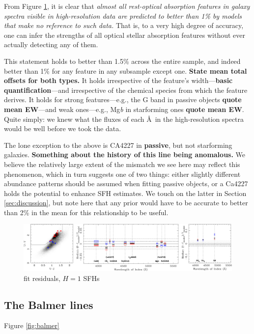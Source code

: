 \documentclass[a4paper,fleqn,usenatbib]{mnras}
\newcommand{\bfr}{\bf\color{red}}
\begin{document}
From Figure \ref{fig:resids}, it is clear that {\it almost all rest-optical absorption features in galaxy 
spectra visible in high-resolution data are predicted to better than 1\% by models that make no reference
to such data.} That is, to a very high degree of accuracy, one can infer the strengths of all optical
stellar absorption features without ever actually detecting any of them.

This statement holds to better than 1.5\% across the entire sample, and indeed better than 1\% for any 
feature in any subsample except one. {\bfr State mean total offsets for both types.} It holds irrespective 
of the feature's width---{\bfr basic quantification}---and irrespective of the chemical species from which 
the feature derives. It holds for strong features---e.g., the G band in passive objects {\bfr quote mean
EW}---and weak ones---e.g., Mg{\it b} in starforming ones {\bfr quote mean EW}. Quite simply: we 
knew what the fluxes of each \AA\ in the high-resolution spectra would be well before we took the data.

The lone exception to the above is CA4227 in {\bfr passive}, but not starforming galaxies. {\bfr Something 
about the history of this line being anomalous.} We believe the relatively large extent of the mismatch we 
see here may reflect this phenomenon, which in turn suggests one of two things: either slightly different
abundance patterns should be assumed when fitting passive objects, or a Ca4227 holds the potential
to enhance SFH estimates. We touch on the latter in Section \ref{sec:discussion}, but note here that
any prior would have to be accurate to better than 2\% in the mean for this relationship to be useful.

\begin{figure}
\includegraphics[width = \textwidth]{residuals}
\caption{fit residuals, $H=1$ SFHs}
\label{fig:resids}
\end{figure}

\subsection{The Balmer lines}

Figure \ref{fig:balmer} 
\end{document}
